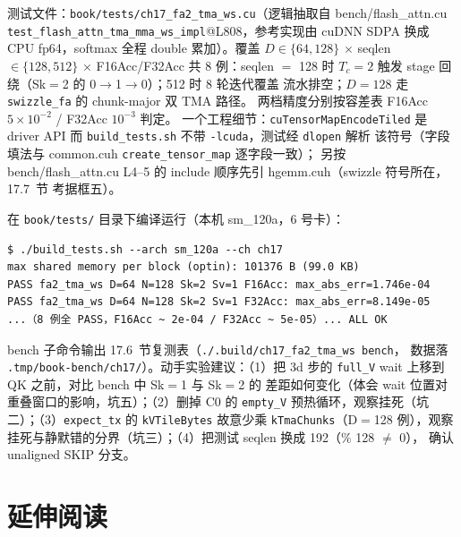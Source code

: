 测试文件：\texttt{book/\allowbreak{}tests/\allowbreak{}ch17\_\allowbreak{}fa2\_\allowbreak{}tma\_\allowbreak{}ws.cu}（逻辑抽取自 bench/flash\_attn.cu
\texttt{test\_\allowbreak{}flash\_\allowbreak{}attn\_\allowbreak{}tma\_\allowbreak{}mma\_\allowbreak{}ws\_\allowbreak{}impl}@L808，参考实现由 cuDNN SDPA
换成 CPU fp64，softmax 全程 double 累加）。覆盖 $D \in \{64, 128\}$ $\times$
seqlen $\in \{128, 512\}$ $\times$ F16Acc/F32Acc 共 8 例：seqlen $=$ 128 时
$T_c{=}2$ 触发 stage 回绕（Sk$=$2 的 0$\to$1$\to$0）；512 时 8 轮迭代覆盖
流水排空；$D{=}128$ 走 \texttt{swizzle\_fa} 的 chunk-major 双 TMA 路径。
两档精度分别按容差表 F16Acc $5 \times 10^{-2}$ / F32Acc $10^{-3}$ 判定。
一个工程细节：\texttt{cu\allowbreak{}Tensor\allowbreak{}Map\allowbreak{}Encode\allowbreak{}Tiled} 是 driver API 而
\texttt{build\_\allowbreak{}tests.\allowbreak{}sh} 不带 \texttt{-lcuda}，测试经 \texttt{dlopen} 解析
该符号（字段填法与 common.cuh \texttt{create\_\allowbreak{}tensor\_\allowbreak{}map} 逐字段一致）；
另按 bench/flash\_attn.cu L4--5 的 include 顺序先引 hgemm.cuh（swizzle 符号所在，17.7~节
考据框五）。

在 \texttt{book/tests/} 目录下编译运行（本机 sm\_120a，6 号卡）：

\begin{lstlisting}[style=console]
$ ./build_tests.sh --arch sm_120a --ch ch17
max shared memory per block (optin): 101376 B (99.0 KB)
PASS fa2_tma_ws D=64 N=128 Sk=2 Sv=1 F16Acc: max_abs_err=1.746e-04
PASS fa2_tma_ws D=64 N=128 Sk=2 Sv=1 F32Acc: max_abs_err=8.149e-05
...（8 例全 PASS，F16Acc ~ 2e-04 / F32Acc ~ 5e-05）... ALL OK
\end{lstlisting}

bench 子命令输出 17.6~节复测表（\texttt{.\allowbreak{}/\allowbreak{}.\allowbreak{}build/\allowbreak{}ch17\_\allowbreak{}fa2\_\allowbreak{}tma\_\allowbreak{}ws bench}，
数据落 \texttt{.\allowbreak{}tmp/\allowbreak{}book-bench/\allowbreak{}ch17/\allowbreak{}}）。动手实验建议：（1）把 3d 步的
\texttt{full\_V} wait 上移到 QK 之前，对比 bench 中 Sk$=$1 与 Sk$=$2 的
差距如何变化（体会 wait 位置对重叠窗口的影响，坑五）；（2）删掉 C0 的
\texttt{empty\_V} 预热循环，观察挂死（坑二）；（3）\texttt{expect\_tx} 的
\texttt{kVTileBytes} 故意少乘 \texttt{kTmaChunks}（D$=$128 例），观察
挂死与静默错的分界（坑三）；（4）把测试 seqlen 换成 192（$\%$ 128 $\ne$ 0），
确认 unaligned SKIP 分支。

\section*{延伸阅读}


